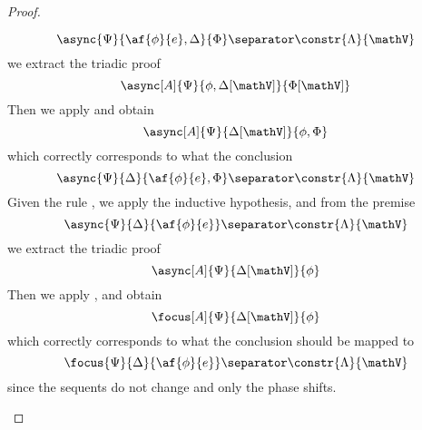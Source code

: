 \begin{proof}
\begin{itemize}
			$$ \async{\Psi}{\af{\phi}{e}, \Delta}{\Phi} \separator \constr{\Lambda}{\mathV} $$
			we extract the triadic proof
			$$ \async[A]{\Psi}{\phi, \Delta[\mathV]}{\Phi[\mathV]} $$
			Then we apply \derRule[A]{\displaytodelta} and obtain
			$$ \async[A]{\Psi}{\Delta[\mathV]}{\phi, \Phi} $$
			which correctly corresponds to what the conclusion
			$$ \async{\Psi}{\Delta}{\af{\phi}{e}, \Phi} \separator \constr{\Lambda}{\mathV} $$
		\indCase{\displaytoasy} Given the rule \derRule{\displaytoasy}, we apply the inductive hypothesis, and from the premise
			$$ \async{\Psi}{\Delta}{\af{\phi}{e}} \separator \constr{\Lambda}{\mathV} $$
			we extract the triadic proof
			$$ \async[A]{\Psi}{\Delta[\mathV]}{\phi} $$
			Then we apply \derRule[A]{\displaytoasy}, and obtain
			$$ \focus[A]{\Psi}{\Delta[\mathV]}{\phi} $$
			which correctly corresponds to what the conclusion should be mapped to
			$$ \focus{\Psi}{\Delta}{\af{\phi}{e}} \separator \constr{\Lambda}{\mathV} $$
			since the sequents do not change and only the phase shifts.
	\end{itemize}
\end{proof}


